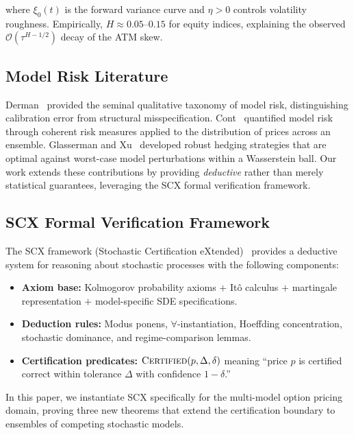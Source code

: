 \documentclass[11pt,a4paper]{article}
\theoremstyle{plain}
\theoremstyle{definition}
\theoremstyle{remark}
\newcommand{\SCX}{\textsc{SCX}}
\begin{document}
where $\xi_0(t)$ is the forward variance curve and $\eta > 0$ controls volatility roughness. Empirically, $H \approx 0.05$--$0.15$ for equity indices, explaining the observed $\mathcal{O}(\tau^{H-1/2})$ decay of the ATM skew.

\subsection{Model Risk Literature}

Derman~\citep{derman1996model} provided the seminal qualitative taxonomy of model risk, distinguishing calibration error from structural misspecification. Cont~\citep{cont2006model} quantified model risk through coherent risk measures applied to the distribution of prices across an ensemble. Glasserman and Xu~\citep{glasserman2014robust} developed robust hedging strategies that are optimal against worst-case model perturbations within a Wasserstein ball. Our work extends these contributions by providing \emph{deductive} rather than merely statistical guarantees, leveraging the \SCX{} formal verification framework.

\subsection{SCX Formal Verification Framework}

The \SCX{} framework (Stochastic Certification eXtended)~\citep{scx2025} provides a deductive system for reasoning about stochastic processes with the following components:

\begin{itemize}[nosep]
  \item \textbf{Axiom base:} Kolmogorov probability axioms $+$ It\^o calculus $+$ martingale representation $+$ model-specific SDE specifications.
  \item \textbf{Deduction rules:} Modus ponens, $\forall$-instantiation, Hoeffding concentration, stochastic dominance, and regime-comparison lemmas.
  \item \textbf{Certification predicates:} $\textsc{Certified}(p, \Delta, \delta)$ meaning ``price $p$ is certified correct within tolerance $\Delta$ with confidence $1-\delta$.''
\end{itemize}

In this paper, we instantiate \SCX{} specifically for the multi-model option pricing domain, proving three new theorems that extend the certification boundary to ensembles of competing stochastic models.
\end{document}
